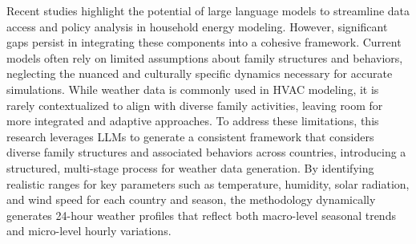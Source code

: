 Recent studies highlight the potential of large language models to streamline data access and policy analysis in household energy modeling. However, significant gaps persist in integrating these components into a cohesive framework. Current models often rely on limited assumptions about family structures and behaviors, neglecting the nuanced and culturally specific dynamics necessary for accurate simulations. While weather data is commonly used in HVAC modeling, it is rarely contextualized to align with diverse family activities, leaving room for more integrated and adaptive approaches. To address these limitations, this research leverages LLMs to generate a consistent framework that considers diverse family structures and associated behaviors across countries, introducing a structured, multi-stage process for weather data generation. By identifying realistic ranges for key parameters such as temperature, humidity, solar radiation, and wind speed for each country and season, the methodology dynamically generates 24-hour weather profiles that reflect both macro-level seasonal trends and micro-level hourly variations.